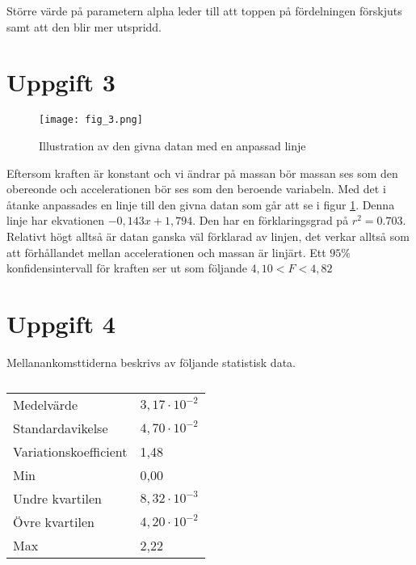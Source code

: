 \documentclass[a4paper]{article}
\begin{document}
Större värde på parametern alpha leder till att toppen på fördelningen förskjuts samt att den blir mer utspridd. 

\section{Uppgift 3}

\begin{figure}[H]
    \begin{small}
        \begin{center}
            \texttt{[image: fig\_3.png]}
        \end{center}
        \caption{Illustration av den givna datan med en anpassad linje}
        \label{fig:3}
    \end{small}
\end{figure}

Eftersom kraften är konstant och vi ändrar på massan bör massan ses som den obereonde och accelerationen bör ses som den beroende variabeln. Med det i åtanke anpassades en linje till den givna datan som går att se i figur \ref{fig:3}. Denna linje har ekvationen $-0,143x + 1,794$. Den har en förklaringsgrad på $r^2 = 0.703$. Relativt högt alltså är datan ganska väl förklarad av linjen, det verkar alltså som att förhållandet mellan accelerationen och massan är linjärt. Ett $95\%$ konfidensintervall för kraften ser ut som följande $4,10 < F < 4,82$

\newpage
\section{Uppgift 4}

Mellanankomsttiderna beskrivs av följande statistisk data.

\begin{table}[H]
    \centering
    \caption{}
    \label{tab:my-table}
    \begin{tabular}{ll}
    Medelvärde            & $3,17\cdot 10^{-2}$ \\
    Standardavikelse      & $4,70\cdot 10^{-2}$ \\
    Variationskoefficient & 1,48       \\
    Min                   & 0,00       \\
    Undre kvartilen       & $8,32\cdot 10^{-3}$ \\
    Övre kvartilen        & $4,20\cdot 10^{-2}$ \\
    Max                   & 2,22                     
    \end{tabular}
\end{table}
\end{document}
